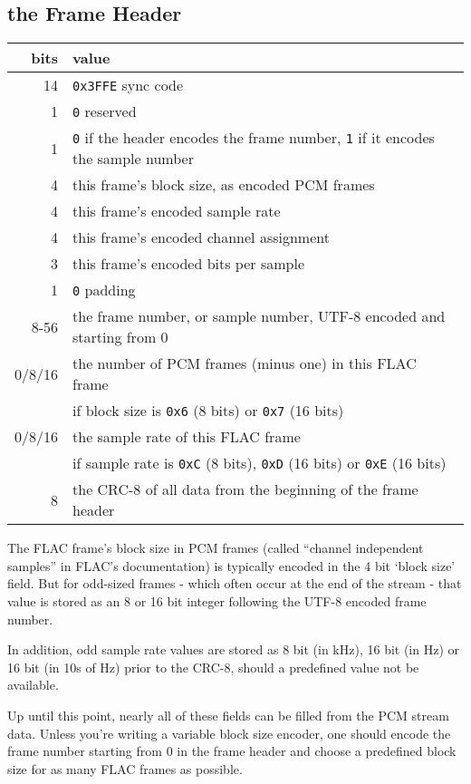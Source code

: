 \subsection{the Frame Header}
\begin{table}[h]
\begin{tabular}{|r|l|}
\hline
bits & value \\
\hline
14 & \texttt{0x3FFE} sync code \\
1 & \texttt{0} reserved \\
1 & \texttt{0} if the header encodes the frame number, \texttt{1} if it encodes the sample number \\
4 & this frame's block size, as encoded PCM frames \\
4 & this frame's encoded sample rate \\
4 & this frame's encoded channel assignment \\
3 & this frame's encoded bits per sample \\
1 & \texttt{0} padding \\
8-56 & the frame number, or sample number, UTF-8 encoded and starting from 0 \\
0/8/16 & the number of PCM frames (minus one) in this FLAC frame \\
& if block size is \texttt{0x6} (8 bits) or \texttt{0x7} (16 bits) \\
0/8/16 & the sample rate of this FLAC frame \\
& if sample rate is \texttt{0xC} (8 bits), \texttt{0xD} (16 bits) or \texttt{0xE} (16 bits) \\
8 & the CRC-8 of all data from the beginning of the frame header \\
\hline
\end{tabular}
\end{table}
\par
\noindent
The FLAC frame's block size in PCM frames
(called ``channel independent samples'' in FLAC's documentation)
is typically encoded in the 4 bit `block size' field.
But for odd-sized frames - which often occur at the end of the stream -
that value is stored as an 8 or 16 bit integer following the UTF-8 encoded
frame number.

In addition, odd sample rate values are stored as 8 bit (in kHz),
16 bit (in Hz) or 16 bit (in 10s of Hz) prior to the CRC-8,
should a predefined value not be available.

Up until this point, nearly all of these fields can be filled from
the PCM stream data.
Unless you're writing a variable block size encoder,
one should encode the frame number starting from 0 in the frame header
and choose a predefined block size for as many FLAC frames as possible.


